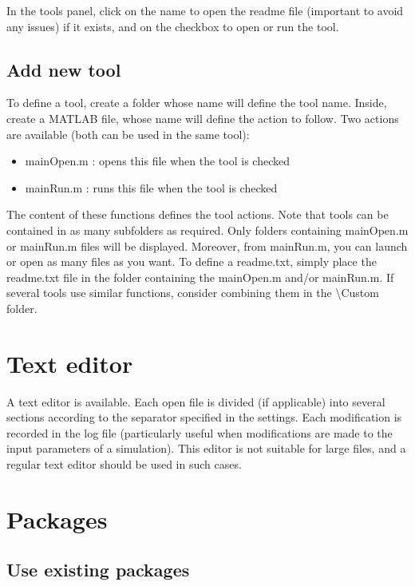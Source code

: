 \documentclass{article}
\begin{document}
In the tools panel, click on the name to open the readme file (important to avoid any issues) if it exists, and on the checkbox to open or run the tool.

\subsection{Add new tool}

To define a tool, create a folder whose name will define the tool name. Inside, create a MATLAB file, whose name will define the action to follow. Two actions are available (both can be used in the same tool):

\begin{itemize}
    \item mainOpen.m : opens this file when the tool is checked
    \item mainRun.m : runs this file when the tool is checked
\end{itemize}

The content of these functions defines the tool actions. Note that tools can be contained in as many subfolders as required. Only folders containing mainOpen.m or mainRun.m files will be displayed. Moreover, from mainRun.m, you can launch or open as many files as you want. To define a readme.txt, simply place the readme.txt file in the folder containing the mainOpen.m and/or mainRun.m. If several tools use similar functions, consider combining them in the \textbackslash Custom folder.

\section{Text editor}

A text editor is available. Each open file is divided (if applicable) into several sections according to the separator specified in the settings. Each modification is recorded in the log file (particularly useful when modifications are made to the input parameters of a simulation). This editor is not suitable for large files, and a regular text editor should be used in such cases.

\section{Packages}

\subsection{Use existing packages}
\end{document}
